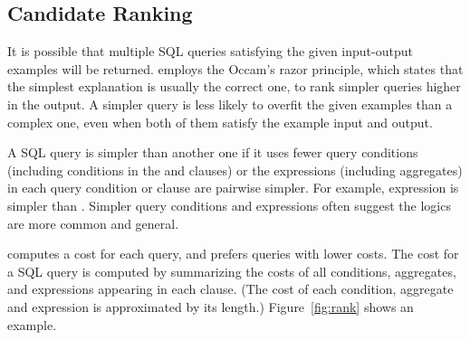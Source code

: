 \subsection{Candidate Ranking}
\label{sec:ranking}

\vspace{-1mm}

It is possible that multiple SQL queries satisfying
the given input-output examples will be returned.
\ourtool employs the Occam's razor principle,
which states that the simplest explanation is
usually the correct one, to rank simpler queries higher in
the output.
A simpler query is less likely to overfit the given examples
than a complex one, even when both of them
satisfy the example input and output.


A SQL query is simpler than another one if it uses
fewer query conditions (including conditions in the 
and  clauses) or the expressions (including
aggregates) in each query condition or clause are pairwise simpler.
For example, expression  is simpler than
.
Simpler query conditions and expressions often suggest the
logics are more common and general.

\ourtool computes a cost for each
query, and prefers queries with lower costs. The cost
for a SQL query is computed by summarizing
the costs of all conditions, aggregates,
and expressions
appearing in each clause. %
(The cost of each condition, aggregate and expression
is approximated by its length.)
Figure~\ref{fig:rank} shows an example.


